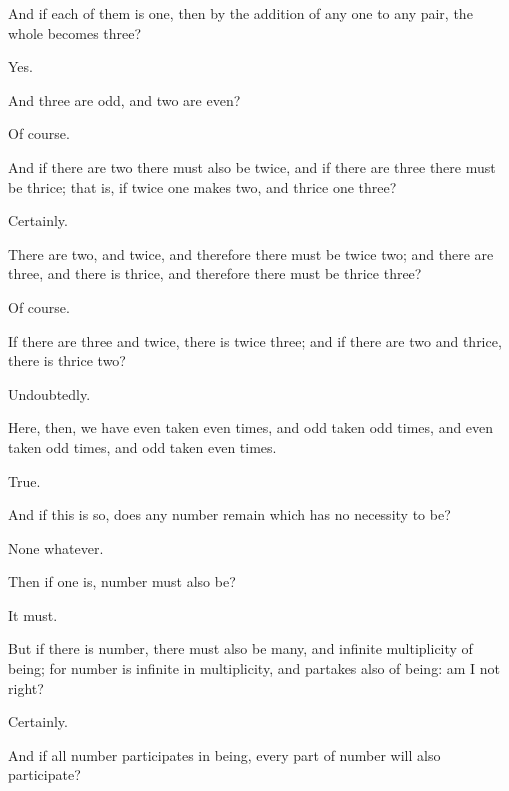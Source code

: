 \documentclass[11pt,letter]{article}
\begin{document}
\par  And if each of them is one, then by the addition of any one to any pair, the whole becomes three?

\par  Yes.

\par  And three are odd, and two are even?

\par  Of course.

\par  And if there are two there must also be twice, and if there are three there must be thrice; that is, if twice one makes two, and thrice one three?

\par  Certainly.

\par  There are two, and twice, and therefore there must be twice two; and there are three, and there is thrice, and therefore there must be thrice three?

\par  Of course.

\par  If there are three and twice, there is twice three; and if there are two and thrice, there is thrice two?

\par  Undoubtedly.

\par  Here, then, we have even taken even times, and odd taken odd times, and even taken odd times, and odd taken even times.

\par  True.

\par  And if this is so, does any number remain which has no necessity to be?

\par  None whatever.

\par  Then if one is, number must also be?

\par  It must.

\par  But if there is number, there must also be many, and infinite multiplicity of being; for number is infinite in multiplicity, and partakes also of being: am I not right?

\par  Certainly.

\par  And if all number participates in being, every part of number will also participate?
\end{document}
